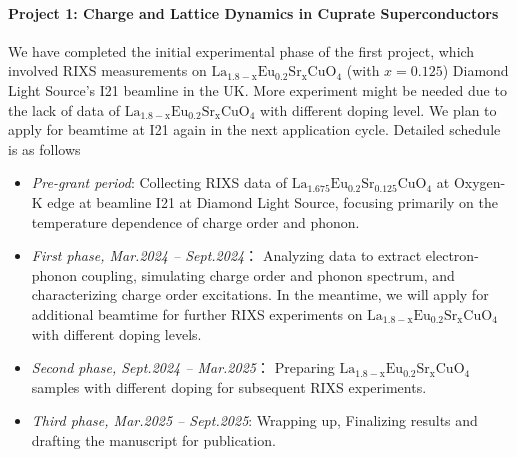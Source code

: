 \documentclass[11pt]{article}
\begin{document}
\paragraph{Project 1: Charge and Lattice Dynamics in Cuprate Superconductors}
We have completed the initial experimental phase of the first project, which involved RIXS measurements on $\mathrm{La_{1.8-x}Eu_{0.2}Sr_xCuO_{4}}$ (with $x=0.125$) Diamond Light Source's I21 beamline in the UK. More experiment might be needed due to the lack of data of $\mathrm{La_{1.8-x}Eu_{0.2}Sr_xCuO_{4}}$ with different doping level. We plan to apply for beamtime at I21 again in the next application cycle. Detailed schedule is as follows
\begin{itemize}
  \item \textit{Pre-grant period}: Collecting RIXS data of $\mathrm{La_{1.675}Eu_{0.2}Sr_{0.125}CuO_{4}}$ at Oxygen-K edge at beamline I21 at Diamond Light Source, focusing primarily on the temperature dependence of charge order and phonon. 
  \item \textit{First phase, Mar.2024 -- Sept.2024}： Analyzing data to extract electron-phonon coupling, simulating charge order and phonon spectrum, and characterizing charge order excitations. In the meantime, we will apply for additional beamtime for further RIXS experiments on $\mathrm{La_{1.8-x}Eu_{0.2}Sr_xCuO_{4}}$ with different doping levels. 
  \item \textit{Second phase, Sept.2024 -- Mar.2025}： Preparing $\mathrm{La_{1.8-x}Eu_{0.2}Sr_xCuO_{4}}$ samples with different doping for subsequent RIXS experiments. 
  \item \textit{Third phase, Mar.2025 -- Sept.2025}: Wrapping up,  Finalizing results and drafting the manuscript for publication.
\end{itemize}
\end{document}
